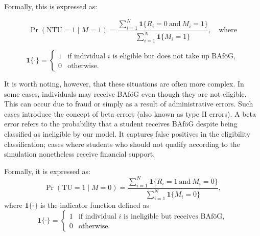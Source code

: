 Formally, this is expressed as:

\begin{equation}
\Pr(\text{NTU} = 1 \mid M = 1) = \frac{\sum_{i=1}^{N} \mathbf{1}\{R_i = 0 \ \text{and} \ M_i = 1\}}{\sum_{i=1}^{N} \mathbf{1}\{M_i = 1\}}, \quad\text{where} 
\end{equation}

\begin{equation}
  \mathbf{1}\{\cdot\} =
  \begin{cases}
  1 & \text{if individual } i \text{ is eligible but does not take up BAföG}, \\
  0 & \text{otherwise}.
  \end{cases}
\label{eq:indicator-function-ntu}
\end{equation}


It is worth noting, however, that these situations are often more complex. 
In some cases, individuals may receive BAföG even though they are not eligible. 
This can occur due to fraud or simply as a result of administrative errors. 
Such cases introduce the concept of beta errors (also known as type II errors). 
A beta error refers to the probability that a student receives BAföG despite being classified as ineligible by our model. 
It captures false positives in the eligibility classification; cases where students who should not qualify according to the simulation nonetheless receive financial support.

Formally, it is expressed as:
\begin{equation}
\Pr(\text{TU} = 1 \mid M = 0) = \frac{\sum_{i=1}^{N} \mathbf{1}\{R_i = 1 \ \text{and} \ M_i = 0\}}{\sum_{i=1}^{N} \mathbf{1}\{M_i = 0\}},
\end{equation}
where \( \mathbf{1}\{\cdot\} \) is the indicator function defined as
\[
\mathbf{1}\{\cdot\} =
\begin{cases}
1 & \text{if individual } i \text{ is ineligible but receives BAföG}, \\
0 & \text{otherwise}.
\end{cases}
\]



